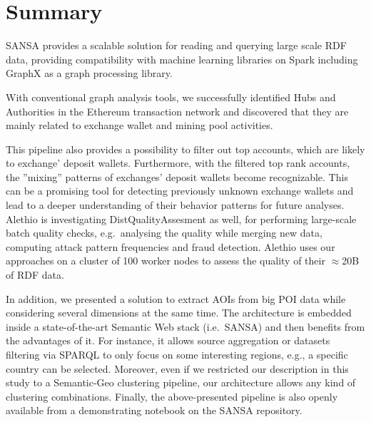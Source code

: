 \section{Summary}
SANSA provides a scalable solution for reading and querying large scale \gls{RDF} data, providing compatibility with machine learning libraries on Spark including GraphX as a graph processing library.

With conventional graph analysis tools, we successfully identified Hubs and Authorities in the Ethereum transaction network and discovered that they are mainly related to exchange wallet and mining pool activities.

This pipeline also provides a possibility to filter out top accounts, which are likely to exchange' deposit wallets. 
Furthermore, with the filtered top rank accounts, the ''mixing'' patterns of exchanges' deposit wallets become recognizable. 
This can be a promising tool for detecting previously unknown exchange wallets and lead to a deeper understanding of their behavior patterns for future analyses.
Alethio is investigating DistQualityAssesment as well, for performing large-scale batch quality checks, e.g.~analysing the quality while merging new data, computing attack pattern frequencies and fraud detection. 
Alethio uses our approaches on a cluster of 100 worker nodes to assess the quality of their $\approx$20B of \gls{RDF} data.

In addition, we presented a solution to extract \gls{AOI}s from big \gls{POI} data while considering several dimensions at the same time. The architecture is embedded inside a state-of-the-art Semantic Web stack (i.e.~SANSA) and then benefits from the advantages of it. For instance, it allows source aggregation or datasets filtering via \gls{SPARQL} to only focus on some interesting regions, e.g., a specific country can be selected. 
Moreover, even if we restricted our description in this study to a Semantic-Geo clustering pipeline, our architecture allows any kind of clustering combinations.
Finally, the above-presented pipeline is also openly available from a demonstrating notebook on the SANSA repository.
